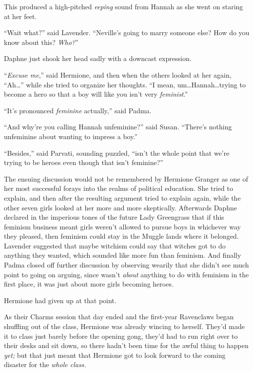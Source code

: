 This produced a high-pitched \emph{eeping} sound from Hannah as she went on staring at her feet.

“Wait what?” said Lavender. “Neville’s going to marry someone else? How do you know about this? \emph{Who?}”

Daphne just shook her head sadly with a downcast expression.

“\emph{Excuse me},” said Hermione, and then when the others looked at her again, “Ah…” while she tried to organize her thoughts. “I mean, um…Hannah…trying to become a hero so that a boy will like you isn’t very \emph{feminist}.”

“It’s pronounced \emph{feminine} actually,” said Padma.

“And why’re you calling Hannah unfeminine?” said Susan. “There’s nothing unfeminine about wanting to impress a boy.”

“Besides,” said Parvati, sounding puzzled, “isn’t the whole point that we’re trying to be heroes even though that isn’t feminine?”

The ensuing discussion would not be remembered by Hermione Granger as one of her most successful forays into the realms of political education. She tried to explain, and then after the resulting argument tried to explain again, while the other seven girls looked at her more and more skeptically. Afterwards Daphne declared in the imperious tones of the future Lady Greengrass that if this feminism business meant girls weren’t allowed to pursue boys in whichever way they pleased, then feminism could stay in the Muggle lands where it belonged. Lavender suggested that maybe witchism could say that witches got to do anything they wanted, which sounded like more fun than feminism. And finally Padma closed off further discussion by observing wearily that she didn’t see much point to going on arguing, since \SPHEW wasn’t \emph{about} anything to do with feminism in the first place, it was just about more girls becoming heroes.

Hermione had given up at that point.

\later

As their Charms session that day ended and the first-year Ravenclaws began shuffling out of the class, Hermione was already wincing to herself. They’d made it to class just barely before the opening gong, they’d had to run right over to their desks and sit down, so there hadn’t been time for the awful thing to happen \emph{yet;} but that just meant that Hermione got to look forward to the coming disaster for the \emph{whole class.}

